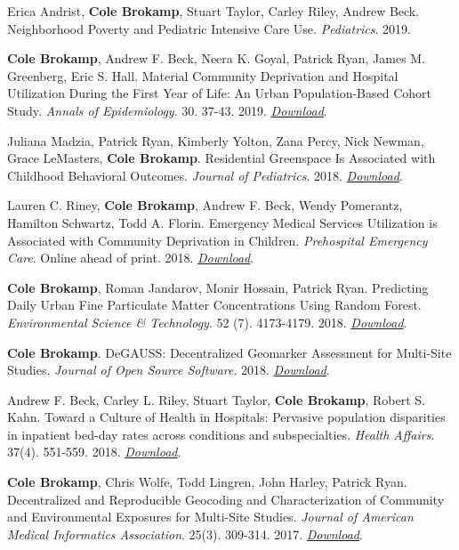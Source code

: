 \documentclass[margin,line]{res}
\begin{document}
\begin{resume}
Erica Andrist, \textbf{Cole Brokamp}, Stuart Taylor, Carley Riley,
Andrew Beck. Neighborhood Poverty and Pediatric Intensive Care Use.
\emph{Pediatrics}. 2019.

\textbf{Cole Brokamp}, Andrew F. Beck, Neera K. Goyal, Patrick Ryan,
James M. Greenberg, Eric S. Hall. Material Community Deprivation and
Hospital Utilization During the First Year of Life: An Urban
Population-Based Cohort Study. \emph{Annals of Epidemiology}. 30. 37-43.
2019.
\href{https://colebrokamp-website.s3.amazonaws.com/publications/Brokamp_AoE_2019.pdf}{\emph{Download}}.

Juliana Madzia, Patrick Ryan, Kimberly Yolton, Zana Percy, Nick Newman,
Grace LeMasters, \textbf{Cole Brokamp}. Residential Greenspace Is
Associated with Childhood Behavioral Outcomes. \emph{Journal of
  Pediatrics}. 2018.
\href{https://colebrokamp-website.s3.amazonaws.com/publications/Madzia_JPeds_2018.pdf}{\emph{Download}}.

Lauren C. Riney, \textbf{Cole Brokamp}, Andrew F. Beck, Wendy Pomerantz,
Hamilton Schwartz, Todd A. Florin. Emergency Medical Services
Utilization is Associated with Community Deprivation in Children.
\emph{Prehospital Emergency Care}. Online ahead of print. 2018.
\href{https://colebrokamp-website.s3.amazonaws.com/publications/Riney_PrehospitalEmergencyCare_2018.pdf}{\emph{Download}}.

\textbf{Cole Brokamp}, Roman Jandarov, Monir Hossain, Patrick Ryan.
Predicting Daily Urban Fine Particulate Matter Concentrations Using
Random Forest. \emph{Environmental Science \& Technology}. 52 (7).
4173-4179. 2018.
\href{https://colebrokamp-website.s3.amazonaws.com/publications/Brokamp_EST_2018_onlineaheadofprint.pdf}{\emph{Download}}.

\textbf{Cole Brokamp}. DeGAUSS: Decentralized Geomarker Assessment for
Multi-Site Studies. \emph{Journal of Open Source Software}. 2018.
\href{https://colebrokamp-website.s3.amazonaws.com/publications/Brokamp_JOSS_2018.pdf}{\emph{Download}}.

Andrew F. Beck, Carley L. Riley, Stuart Taylor, \textbf{Cole Brokamp},
Robert S. Kahn. Toward a Culture of Health in Hospitals: Pervasive
population disparities in inpatient bed-day rates across conditions and
subspecialties. \emph{Health Affairs}. 37(4). 551-559. 2018.
\href{https://colebrokamp-website.s3.amazonaws.com/publications/Beck_HealthAffairs_2018.pdf}{\emph{Download}}.

\textbf{Cole Brokamp}, Chris Wolfe, Todd Lingren, John Harley, Patrick
Ryan. Decentralized and Reproducible Geocoding and Characterization of
Community and Environmental Exposures for Multi-Site Studies.
\emph{Journal of American Medical Informatics Association}. 25(3).
309-314. 2017.
\href{https://colebrokamp-website.s3.amazonaws.com/publications/Brokamp_JAMIA_2017.pdf}{\emph{Download}}.


\end{resume}
\end{document}
